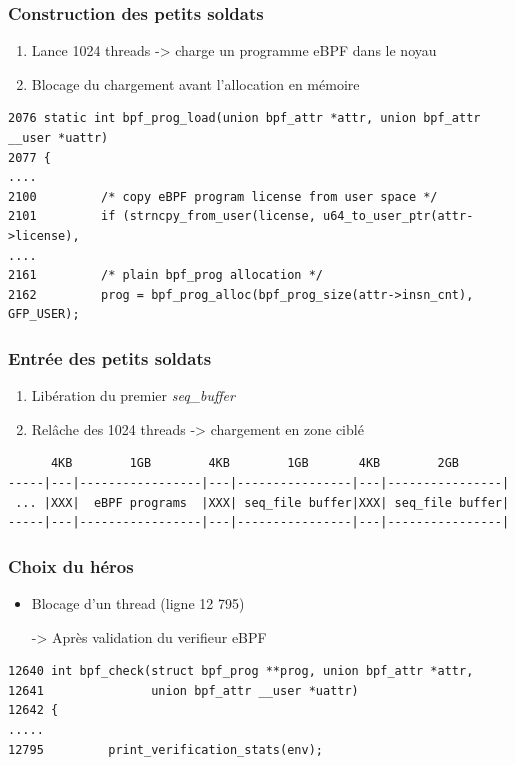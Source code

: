 \documentclass{beamer}
\begin{document}
\begin{frame}[fragile]
    \frametitle{Construction des petits soldats}

    \begin{enumerate}
        \item Lance 1024 threads -> charge un programme eBPF dans le noyau
        \item Blocage du chargement avant l'allocation en mémoire
    \end{enumerate}
    
    \begin{verbatim}
2076 static int bpf_prog_load(union bpf_attr *attr, union bpf_attr __user *uattr)
2077 {
....
2100         /* copy eBPF program license from user space */
2101         if (strncpy_from_user(license, u64_to_user_ptr(attr->license),
....
2161         /* plain bpf_prog allocation */
2162         prog = bpf_prog_alloc(bpf_prog_size(attr->insn_cnt), GFP_USER);
    \end{verbatim} 

\end{frame}


\begin{frame}[fragile]
    \frametitle{Entrée des petits soldats}

    \begin{enumerate}
        \item Libération du premier \textit{seq\_buffer}
        \item Relâche des 1024 threads -> chargement en zone ciblé
    \end{enumerate}
    
    \begin{verbatim}
      4KB        1GB        4KB        1GB       4KB        2GB
-----|---|-----------------|---|----------------|---|----------------|
 ... |XXX|  eBPF programs  |XXX| seq_file buffer|XXX| seq_file buffer|
-----|---|-----------------|---|----------------|---|----------------|
    \end{verbatim} 

\end{frame}

\begin{frame}[fragile]
    \frametitle{Choix du héros}

    \begin{itemize}
        \item Blocage d'un thread (ligne 12 795)
        \item[->] Après validation du verifieur eBPF
    \end{itemize}
        \begin{verbatim}
12640 int bpf_check(struct bpf_prog **prog, union bpf_attr *attr,
12641               union bpf_attr __user *uattr)
12642 {
.....
12795         print_verification_stats(env);
    \end{verbatim} 
\end{frame}
\end{document}
